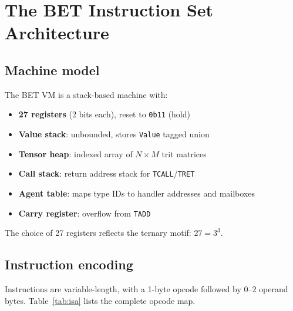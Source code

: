 \documentclass[journal,10pt,twocolumn]{IEEEtran}
\begin{document}
\section{The BET Instruction Set Architecture}
\label{sec:isa}

\subsection{Machine model}

The BET VM is a stack-based machine with:

\begin{itemize}
  \item \textbf{27 registers} (2 bits each), reset to \texttt{0b11} (hold)
  \item \textbf{Value stack}: unbounded, stores \texttt{Value} tagged union
  \item \textbf{Tensor heap}: indexed array of $N \times M$ trit matrices
  \item \textbf{Call stack}: return address stack for \texttt{TCALL}/\texttt{TRET}
  \item \textbf{Agent table}: maps type IDs to handler addresses and mailboxes
  \item \textbf{Carry register}: overflow from \texttt{TADD}
\end{itemize}

The choice of 27 registers reflects the ternary motif: $27 = 3^3$.

\subsection{Instruction encoding}

Instructions are variable-length, with a 1-byte opcode followed by 0–2
operand bytes. Table~\ref{tab:isa} lists the complete opcode map.
\end{document}
